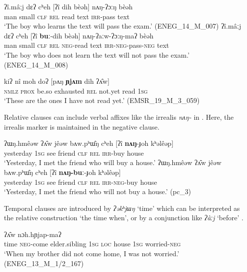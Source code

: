 \documentclass[output=paper,colorlinks,citecolor=brown]{langscibook}
\begin{document}
\ea\label{ex:rum:45}
    \ea\label{ex:rum:45a}
        \gll ʔî.mâːj	dɛʔ	cʰeh	[ʔî	dih	bèəh]	nʌŋ-ʔɔːŋ	bèəh \\ 
             man small \textsc{clf} {\db}\textsc{rel} read text \textsc{irr}{}-pass text \\
        \glt ‘The boy who learns the text will pass the exam.’ (ENEG\_14\_M\_007)
    \ex\label{ex:rum:45b}
        \gll ʔî.mâːj	dɛʔ	cʰeh	[ʔî	\textbf{buː}-dih	bèəh]	nʌŋ-ʔaːw-ʔɔːŋ-maʔ	bèəh \\
             man small \textsc{clf} {\db}\textsc{rel} \textsc{neg}{}-read text \textsc{irr-neg}{}-pass-\textsc{neg} text \\
        \glt ‘The boy who does not learn the text will not pass the exam.’ (ENEG\_14\_M\_008)
    \z
\z 

\ea\label{ex:rum:46}
    \gll kiʔ		nî	moh	doʔ	[pʌŋ	\textbf{ɲjʌm}	dih	ʔʌ̂w] \\
         \textsc{nmlz} \textsc{prox} be.so exhausted {\db}\textsc{rel} not.yet read 1\textsc{sg}\\
    \glt ‘These are the ones I have not read yet.’ (EMSR\_19\_M\_3\_059)
\z 

Relative clauses can include verbal affixes like the irrealis \textit{nʌŋ-} in . Here, the irrealis marker is maintained in the negative clause.

\ea\label{ex:rum:47}
    \ea\label{ex:rum:47a}
        \gll ʔɯŋ.hmêəw	ʔʌ̂w	jêəw	bʌw.pʰɯ̂ŋ	cʰeh	[ʔî	\textbf{nʌŋ}-ɟoh	kʰəlêəp] \\ 
             yesterday 1\textsc{sg} see friend \textsc{clf} {\db}\textsc{rel} \textsc{irr}{}-buy house \\
        \glt ‘Yesterday, I met the friend who will buy a house.’
    \ex\label{ex:rum:47b}
        \gll ʔɯŋ.hmêəw	ʔʌ̂w	jêəw	bʌw.pʰɯ̂ŋ	cʰeh	[ʔî	\textbf{nʌŋ-buː}-ɟoh	kʰəlêəp] \\
             yesterday 1\textsc{sg} see friend \textsc{clf} {\db}\textsc{rel} \textsc{irr}{}-\textsc{neg}{}-buy house \\
        \glt ‘Yesterday, I met the friend who will not buy a house.’ (pc\_3)
    \z
\z 

Temporal clauses are introduced by \textit{ʔəkʰjɯŋ} ‘time’  which can be interpreted as the relative construction ‘the time when’, or by a conjunction like \textit{ʔàːj} ‘before’ .

\ea\label{ex:rum:48}
    	ʔʌ̂w	nɔh.hɲjap-maʔ \\
         {\db}time \textsc{neg}{}-come elder.sibling 1\textsc{sg} \textsc{loc} house 1\textsc{sg} worried{}-\textsc{neg} \\
    \glt ‘When my brother did not come home, I was not worried.’ (ENEG\_13\_M\_1/2\_167)
\z 
\end{document}
